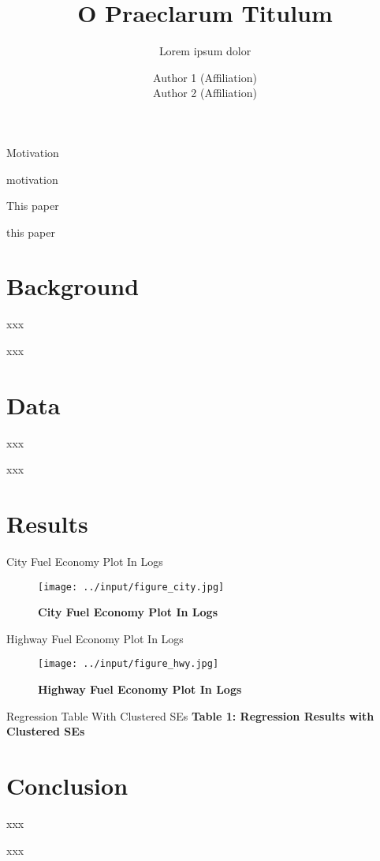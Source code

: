 \documentclass[10pt,t,aspectratio=169]{beamer}
\title{O Praeclarum Titulum}
\subtitle{Lorem ipsum dolor}
\date{}
\author{Author 1 (Affiliation) \\
        Author 2 (Affiliation)}
\begin{document}
\maketitle

\begin{frame}{Motivation}

    motivation

\end{frame}

\begin{frame}{This paper}

    this paper
  
\end{frame}

\section{Background}

\begin{frame}{xxx}

    xxx
  
\end{frame}

\section{Data}

\begin{frame}{xxx}

    xxx
  
\end{frame}

\section{Results}

\begin{frame}{City Fuel Economy Plot In Logs}

	\begin{figure}[!htp]
    	\centering
   	 	\caption{\bf{City Fuel Economy Plot In Logs}}
   		\texttt{[image: ../input/figure\_city.jpg]}
	\end{figure}
  
\end{frame}

\begin{frame}{Highway Fuel Economy Plot In Logs}

	\begin{figure}[!htp]
    	\centering
   	 	\caption{\bf{Highway Fuel Economy Plot In Logs}}
   		\texttt{[image: ../input/figure\_hwy.jpg]}
	\end{figure}
  
\end{frame}

\begin{frame}{Regression Table With Clustered SEs}
  \centering
  \textbf{Table 1: Regression Results with Clustered SEs}
  \vspace{0.3cm}
  \resizebox{\textwidth}{!}{}
\end{frame}


\section{Conclusion}

\begin{frame}{xxx}

    xxx
  
\end{frame}
\end{document}
